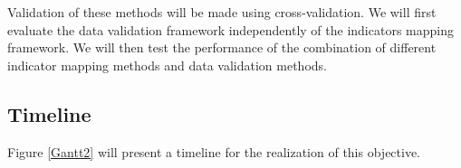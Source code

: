 Validation of these methods will be made using cross-validation. We will first evaluate the data validation framework independently of the indicators mapping framework. We will then test the performance of the combination of different indicator mapping methods and data validation methods.







\subsection{Timeline}

Figure \ref{Gantt2} will present a timeline for the realization of this objective.

